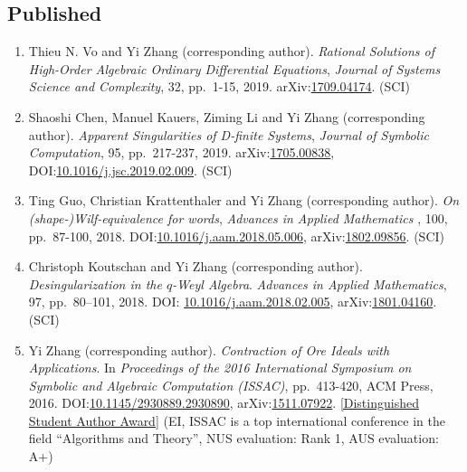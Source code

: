 \documentclass[a4paper,12pt]{article}
\begin{document}
\subsection*{Published}
\begin{enumerate}
 \item Thieu N. Vo and Yi Zhang (corresponding author). {\em Rational Solutions of High-Order Algebraic Ordinary Differential Equations},  {\em Journal of Systems Science and Complexity}, 32, pp.\ 1-15, 2019.
 arXiv:\href{https://arxiv.org/abs/1709.04174}{1709.04174}. (SCI)
  \item Shaoshi Chen, Manuel Kauers, Ziming Li and Yi Zhang (corresponding author). {\em Apparent Singularities of D-finite Systems}, 
 {\em  Journal of Symbolic Computation},  95, pp.\ 217-237, 2019. arXiv:\href{http://arxiv.org/abs/1705.00838}{1705.00838},  
 DOI:\href{https://doi.org/10.1016/j.jsc.2019.02.009}{10.1016/j.jsc.2019.02.009}. (SCI)
\item Ting Guo, Christian Krattenthaler and Yi Zhang (corresponding author).
{\em On (shape-)Wilf-equivalence for words}, 
{\em  Advances in Applied Mathematics} , 100, pp.\ 87-100, 2018. 
DOI:\href{https://doi.org/10.1016/j.aam.2018.05.006}{10.1016/j.aam.2018.05.006}, 
arXiv:\href{https://arxiv.org/pdf/1802.09856.pdf}{1802.09856}. (SCI)
\item Christoph Koutschan and Yi Zhang (corresponding author). {\em Desingularization in the $q$-Weyl Algebra}. 
{\em Advances in Applied Mathematics}, 97, pp.\ 80–101, 2018. 
DOI: \href{http://dx.doi.org/10.1016/j.aam.2018.02.005}{10.1016/j.aam.2018.02.005},
arXiv:\href{https://arxiv.org/abs/1801.04160}{1801.04160}. (SCI) 
\item Yi Zhang (corresponding author). {\em Contraction of Ore Ideals with Applications}. 
In {\em Proceedings of the 2016 International Symposium on Symbolic and Algebraic Computation (ISSAC)}, 
pp.\ 413-420, ACM Press, 2016. DOI:\href{http://dl.acm.org/citation.cfm?id=2930890}{10.1145/2930889.2930890},
arXiv:\href{https://arxiv.org/abs/1511.07922}{1511.07922}. 
\href{https://www.sigsam.org/Awards/ISSACAwards.html}{[Distinguished Student Author Award]} 
(EI, ISSAC is a top international conference in the field ``Algorithms and Theory'', NUS evaluation: Rank 1, AUS evaluation: A+) 
\end{enumerate}
\end{document}
